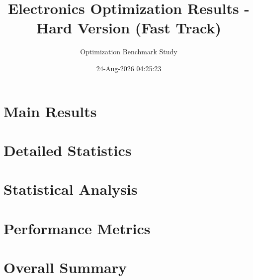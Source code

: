 \documentclass[12pt,a4paper]{article}
\begin{document}
\title{Electronics Optimization Results - Hard Version (Fast Track)}
\author{Optimization Benchmark Study}
\date{24-Aug-2026 04:25:23}
\maketitle

\section{Main Results}



\section{Detailed Statistics}











\section{Statistical Analysis}







\section{Performance Metrics}





\section{Overall Summary}


\end{document}
